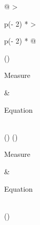 \documentclass[
]{book}
\begin{document}
\begin{longtable}[]{@{}
  >{\raggedright\arraybackslash}p{(\columnwidth - 2\tabcolsep) * }
  >{\raggedright\arraybackslash}p{(\columnwidth - 2\tabcolsep) * }@{}}
\caption{\label{tab:variation} Common measures of variation. \(N\) refers to the number of data points.}\tabularnewline
\toprule()
\begin{minipage}[b]{\linewidth}\raggedright
Measure
\end{minipage} & \begin{minipage}[b]{\linewidth}\raggedright
Equation
\end{minipage} \\
\midrule()
\endfirsthead
\toprule()
\begin{minipage}[b]{\linewidth}\raggedright
Measure
\end{minipage} & \begin{minipage}[b]{\linewidth}\raggedright
Equation
\end{minipage} \\
\midrule()
\endhead

\end{longtable}
\end{document}
